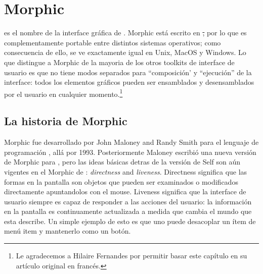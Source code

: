 \documentclass[a4paper,10pt,twoside]{book}
\begin{document}
	\sloppy
\fi
\renewcommand\yellowbox[1]{\relax}
\renewcommand\nnbb[2]{\relax} 

\chapter{Morphic}


 es el nombre de la interface gr\'afica de \pharo.
Morphic est\'a escrito en \st, por lo que es complementamente portable entre distintos sistemas operativos; como consecuencia de ello, \pharo se ve exactamente igual en Unix, MacOS y Windows.
Lo que distingue a Morphic de la mayoria de los otros toolkits de interface de usuario es que no tiene modos separados para  ``composici\'on' y ``ejecuci\'on'' de la interface: todos los elementos gráficos pueden ser ensamblados y desensamblados por el usuario en cualquier momento.\footnote{Le agradecemos a Hilaire Fernandes por permitir basar este cap\'itulo en su art\'iculo original en franc\'es.}



\section{La historia de Morphic}

Morphic fue desarrollado por John Maloney and Randy Smith para el lenguaje de programaci\'on  , all\'a por 1993. 
Posteriormente Maloney escribi\'o una nueva versi\'on de Morphic para \squeak, pero las ideas b\'asicas detras de la versi\'on de Self son a\'un vigentes en el Morphic de \pharo: \emph{directness} and \emph{liveness}.
Directness significa que las formas en la pantalla son objetos que pueden ser examinados o modificados directamente apuntandolos con el mouse.
Liveness significa que la interface de usuario siempre es capaz de responder a las acciones del usuario: la informaci\'on en la pantalla es continuamente actualizada a medida que cambia el mundo que esta describe.
Un simple ejemplo de esto es que uno puede desacoplar un ítem de men\'u item y mantenerlo como un bot\'on.
\end{document}
